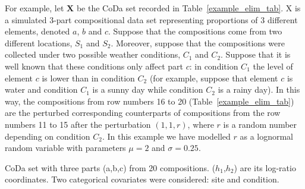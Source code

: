 \documentclass[12pt, a4paper]{article}
\begin{document}
For example, let $\mathbf{X}$ be the CoDa set recorded in Table~\ref{example_elim_tab}. X is a simulated $3$-part compositional data set representing proportions of $3$ different elements, denoted $a$, $b$ and $c$. Suppose that the  compositions come from two different locations, $S_1$ and $S_2$. Moreover, suppose that the compositions were collected under two possible weather conditions, $C_1$ and $C_2$. Suppose that it is well known
that these conditions only affect part $c$: in condition $C_1$ the level of element $c$ is lower than in condition $C_2$ (for example, suppose that element $c$ is water and condition $C_1$ is a sunny day while condition $C_2$ is a rainy day). In this way, the compositions from row numbers 16 to 20 (Table~\ref{example_elim_tab}) are the perturbed corresponding counterparts of compositions from the
row numbers 11 to 15 after the perturbation $(1,1,r)$, where $r$ is a random number depending on condition $C_2$. In this example we have modelled $r$ as a lognormal random variable with parameters $\mu=2$ and $\sigma=0.25$. 
\begin{table}[htpb]
\centering
\scriptsize

\caption{CoDa set with three parts (a,b,c) from 20 compositions. ($h_1$,$h_2$) are its log-ratio coordinates.
Two categorical covariates were considered: site and condition. }
\label{example_elim_tab}
\end{table}
\end{document}

